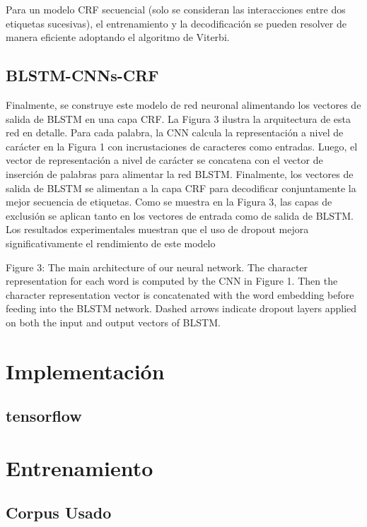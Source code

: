 \documentclass[runningheads]{llncs}
\begin{document}
Para un modelo CRF secuencial (solo se consideran las interacciones entre dos etiquetas sucesivas), el entrenamiento y la decodificación se pueden resolver de manera eficiente adoptando el algoritmo de Viterbi.
\subsection{BLSTM-CNNs-CRF}
	
Finalmente, se construye este modelo de red neuronal alimentando los vectores de salida de BLSTM en una capa CRF. La Figura 3 ilustra la arquitectura de esta red en detalle. Para cada palabra, la CNN calcula la representación a nivel de carácter en la Figura 1 con incrustaciones de caracteres como entradas. Luego, el vector de representación a nivel de carácter se concatena con el vector de inserción de palabras para alimentar la red BLSTM. Finalmente, los vectores de salida de BLSTM se alimentan a la capa CRF para decodificar conjuntamente la mejor secuencia de etiquetas. Como se muestra en la Figura 3, las capas de exclusión se aplican tanto en los vectores de entrada como de salida de BLSTM. Los resultados experimentales muestran que el uso de dropout mejora significativamente el rendimiento de este modelo

Figure 3: The main architecture of our neural
network. The character representation for each
word is computed by the CNN in Figure 1. Then
the character representation vector is concatenated
with the word embedding before feeding into the
BLSTM network. Dashed arrows indicate dropout
layers applied on both the input and output vectors
of BLSTM.



\section{Implementación}

\subsection{tensorflow}

\section{Entrenamiento}

\subsection{Corpus Usado}
\end{document}
